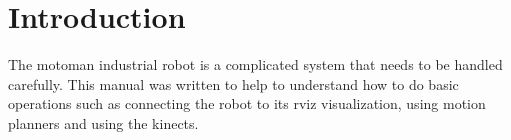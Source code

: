 \section{Introduction}

The motoman industrial robot is a complicated system that needs to be handled carefully. This manual was written to help to understand how to do basic operations such as connecting the robot to its rviz visualization, using motion planners and using the kinects.